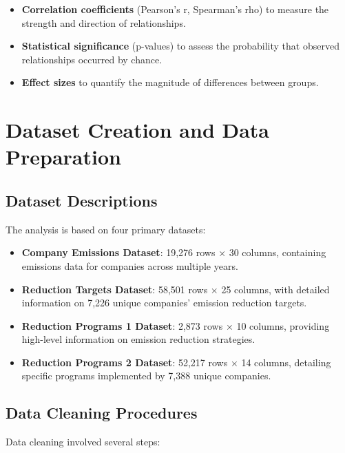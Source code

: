 \documentclass[11pt,a4paper]{article}
\begin{document}
\begin{itemize}
    \item \textbf{Correlation coefficients} (Pearson's r, Spearman's rho) to measure the strength and direction of relationships.
    
    \item \textbf{Statistical significance} (p-values) to assess the probability that observed relationships occurred by chance.
    
    \item \textbf{Effect sizes} to quantify the magnitude of differences between groups.
\end{itemize}

\section{Dataset Creation and Data Preparation}

\subsection{Dataset Descriptions}
The analysis is based on four primary datasets:

\begin{itemize}
    \item \textbf{Company Emissions Dataset}: 19,276 rows × 30 columns, containing emissions data for companies across multiple years.
    
    \item \textbf{Reduction Targets Dataset}: 58,501 rows × 25 columns, with detailed information on 7,226 unique companies' emission reduction targets.
    
    \item \textbf{Reduction Programs 1 Dataset}: 2,873 rows × 10 columns, providing high-level information on emission reduction strategies.
    
    \item \textbf{Reduction Programs 2 Dataset}: 52,217 rows × 14 columns, detailing specific programs implemented by 7,388 unique companies.
\end{itemize}

\subsection{Data Cleaning Procedures}
Data cleaning involved several steps:
\end{document}
